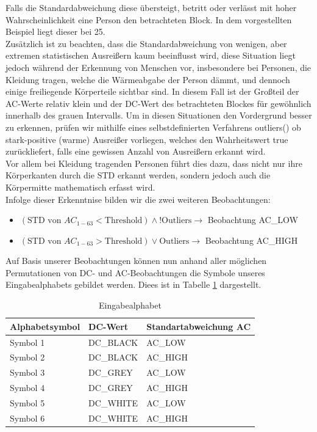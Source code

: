 Falls die Standardabweichung diese übersteigt, betritt oder verlässt mit hoher Wahrscheinlichkeit eine Person den betrachteten Block.
In dem vorgestellten Beispiel liegt dieser bei 25.\\
Zusätzlich ist zu beachten, dass die Standardabweichung von wenigen, aber extremen statistischen Ausreißern kaum beeinflusst wird, diese Situation liegt  jedoch während der Erkennung von Menschen vor, insbesondere bei Personen, die Kleidung tragen, welche die Wärmeabgabe der Person dämmt, und dennoch einige freiliegende Körperteile sichtbar sind.
In diesem Fall ist der Großteil der AC-Werte relativ klein und der DC-Wert des betrachteten Blockes für gewöhnlich innerhalb des grauen Intervalls.
Um in diesen Situationen den Vordergrund besser zu erkennen, prüfen wir mithilfe eines selbstdefinierten Verfahrens outliers() ob stark-positive (warme) Ausreißer vorliegen, welches den Wahrheitswert true zurückliefert, falls eine gewissen Anzahl von Ausreißern erkannt wird.\\
Vor allem bei Kleidung tragenden Personen führt dies dazu, dass nicht nur ihre Körperkanten durch die STD erkannt werden, sondern jedoch auch die Körpermitte mathematisch erfasst wird.\\
Infolge dieser Erkenntnise bilden wir die zwei weiteren Beobachtungen:
\begin{itemize}
	\item $(\text{STD von }AC_{1-63} < \text{Threshold} ) \wedge !\text{Outliers} \rightarrow$  Beobachtung AC\_LOW
	\item $(\text{STD von }AC_{1-63} > \text{Threshold} ) \vee \text{Outliers} \rightarrow$  Beobachtung AC\_HIGH
\end{itemize}
Auf Basis unserer Beobachtungen können nun anhand aller möglichen Permutationen von DC- und AC-Beobachtungen die Symbole unseres Eingabealphabets gebildet werden. Diees ist in Tabelle \ref{table:eingabealphabet} dargestellt.
\begin{table}
	\label{table:eingabealphabet}
	\begin{center}
\begin{tabular}{|l|l|l|}
\hline
\textbf{Alphabetsymbol}&\textbf{DC-Wert}&\textbf{Standartabweichung AC}\\
\hline
Symbol 1&DC\_BLACK&AC\_LOW\\
\hline
Symbol 2&DC\_BLACK&AC\_HIGH\\
\hline
Symbol 3&DC\_GREY&AC\_LOW\\
\hline
Symbol 4&DC\_GREY&AC\_HIGH\\
\hline
Symbol 5&DC\_WHITE&AC\_LOW\\
\hline
Symbol 6&DC\_WHITE&AC\_HIGH\\
\hline
\end{tabular}
	\caption{Eingabealphabet}
\end{center}
\end{table}

